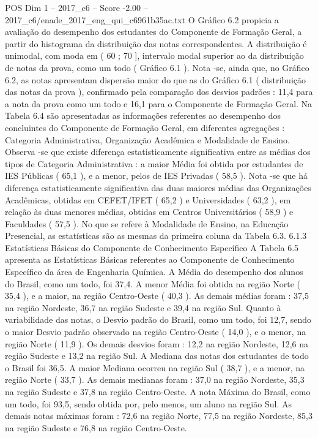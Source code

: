\begin{textsample}{POS Dim 1 – 2017\_c6 – Score -2.00 – 2017\_c6/enade\_2017\_eng\_qui\_c6961b35ac.txt}
O Gráfico 6.2 propicia a avaliação do desempenho dos estudantes do Componente de Formação Geral, a partir do histograma da distribuição das notas correspondentes.
A distribuição é unimodal, com moda em ( 60 ; 70 ], intervalo modal superior ao da distribuição de notas da prova, como um todo ( Gráfico 6.1 ).
Nota -se, ainda que, no Gráfico 6.2, as notas apresentam dispersão maior do que as do Gráfico 6.1 ( distribuição das notas da prova ), confirmado pela comparação dos desvios padrões : 11,4 para a nota da prova como um todo e 16,1 para o Componente de Formação Geral.
Na Tabela 6.4 são apresentadas as informações referentes ao desempenho dos concluintes do Componente de Formação Geral, em diferentes agregações : Categoria Administrativa, Organização Acadêmica e Modalidade de Ensino.
Observa -se que existe diferença estatisticamente significativa entre as médias dos tipos de Categoria Administrativa : a maior Média foi obtida por estudantes de IES Públicas ( 65,1 ), e a menor, pelos de IES Privadas ( 58,5 ).
Nota -se que há diferença estatisticamente significativa das duas maiores médias das Organizações Acadêmicas, obtidas em CEFET/IFET ( 65,2 ) e Universidades ( 63,2 ), em relação às duas menores médias, obtidas em Centros Universitários ( 58,9 ) e Faculdades ( 57,5 ).
No que se refere à Modalidade de Ensino, na Educação Presencial, as estatísticas são as mesmas da primeira coluna da Tabela 6.3. 6.1.3 Estatísticas Básicas do Componente de Conhecimento Específico A Tabela 6.5 apresenta as Estatísticas Básicas referentes ao Componente de Conhecimento Específico da área de Engenharia Química.
A Média do desempenho dos alunos do Brasil, como um todo, foi 37,4.
A menor Média foi obtida na região Norte ( 35,4 ), e a maior, na região Centro-Oeste ( 40,3 ).
As demais médias foram : 37,5 na região Nordeste, 36,7 na região Sudeste e 39,4 na região Sul.
Quanto à variabilidade das notas, o Desvio padrão do Brasil, como um todo, foi 12,7, sendo o maior Desvio padrão observado na região Centro-Oeste ( 14,0 ), e o menor, na região Norte ( 11,9 ).
Os demais desvios foram : 12,2 na região Nordeste, 12,6 na região Sudeste e 13,2 na região Sul.
A Mediana das notas dos estudantes de todo o Brasil foi 36,5.
A maior Mediana ocorreu na região Sul ( 38,7 ), e a menor, na região Norte ( 33,7 ).
As demais medianas foram : 37,0 na região Nordeste, 35,3 na região Sudeste e 37,8 na região Centro-Oeste.
A nota Máxima do Brasil, como um todo, foi 93,5, sendo obtida por, pelo menos, um aluno na região Sul.
As demais notas máximas foram : 72,6 na região Norte, 77,5 na região Nordeste, 85,3 na região Sudeste e 76,8 na região Centro-Oeste.

\end{textsample}

